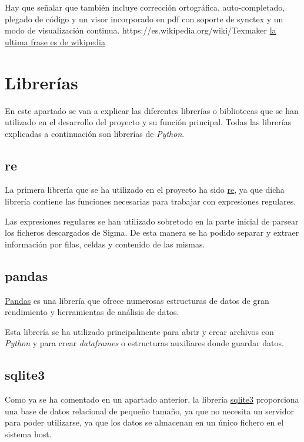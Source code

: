 Hay que señalar que también incluye corrección ortográfica, auto-completado, plegado de código y un visor incorporado en pdf con soporte de synctex y un modo de visualización continua. 
\cite{texmaker} https://es.wikipedia.org/wiki/Texmaker
\href{}{la ultima frase es de wikipedia}


\section{Librerías}\label{librerias}
En este apartado se van a explicar las diferentes librerías o bibliotecas que se han utilizado en el desarrollo del proyecto y su función principal. Todas las librerías explicadas a continuación son librerías de \emph{Python}.

\subsection{re}
La primera librería que se ha utilizado en el proyecto ha sido \href{https://docs.python.org/3/library/re.html}{re}, ya que dicha librería contiene las funciones necesarias para trabajar con expresiones regulares.

Las expresiones regulares se han utilizado sobretodo en la parte inicial de parsear los ficheros descargados de Sigma. De esta manera se ha podido separar y extraer información por filas, celdas y contenido de las mismas.


\subsection{pandas}
\href{https://pandas.pydata.org/}{Pandas} es una librería que ofrece numerosas estructuras de datos de gran rendimiento y herramientas de análisis de datos.

Esta librería se ha utilizado principalmente para abrir y crear archivos con \emph{Python} y para crear \emph{dataframes} o estructuras auxiliares donde guardar datos.  


\subsection{sqlite3}
Como ya se ha comentado en un apartado anterior, la librería \href{https://docs.python.org/2/library/sqlite3.html}{sqlite3} proporciona una base de datos relacional de pequeño tamaño, ya que no necesita un servidor para poder utilizarse, ya que los datos se almacenan en un único fichero en el sistema host.

